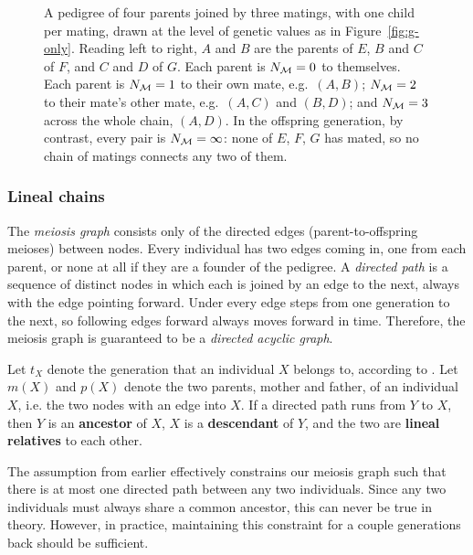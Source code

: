\documentclass[12pt]{article}
\begin{document}
\begin{figure}[H]
    \begin{floatcard}
        
        \caption{%
            A pedigree of four parents joined by three matings, with one child per mating, drawn at the level of genetic values as in Figure~\ref{fig:g-only}.
            Reading left to right, $A$ and $B$ are the parents of $E$, $B$ and $C$ of $F$, and $C$ and $D$ of $G$.
            Each parent is $N_{\mathcal{M}} = 0$ to themselves.
            Each parent is $N_{\mathcal{M}} = 1$ to their own mate, e.g.\ $(A,B)$; $N_{\mathcal{M}} = 2$ to their mate's other mate, e.g.\ $(A,C)$ and $(B,D)$; and $N_{\mathcal{M}} = 3$ across the whole chain, $(A,D)$.
            In the offspring generation, by contrast, every pair is $N_{\mathcal{M}} = \infty$: none of $E$, $F$, $G$ has mated, so no chain of matings connects any two of them.%
        }
        \label{fig:step-sib}
    \end{floatcard}
\end{figure}

\subsubsection{Lineal chains}
The \emph{meiosis graph} consists only of the directed edges (parent-to-offspring meioses) between nodes.
Every individual has two edges coming in, one from each parent, or none at all if they are a founder of the pedigree.
A \emph{directed path} is a sequence of distinct nodes in which each is joined by an edge to the next, always with the edge pointing forward.
Under  every edge steps from one generation to the next, so following edges forward always moves forward in time.
Therefore, the meiosis graph is guaranteed to be a \emph{directed acyclic graph}.

Let $t_X$ denote the generation that an individual $X$ belongs to, according to .
Let $m(X)$ and $p(X)$ denote the two parents, mother and father, of an individual $X$, i.e. the two nodes with an edge into $X$.
If a directed path runs from $Y$ to $X$, then $Y$ is an \textbf{ancestor} of $X$, $X$ is a \textbf{descendant} of $Y$, and the two are \textbf{lineal relatives} to each other.

The  assumption from earlier effectively constrains our meiosis graph such that there is at most one directed path between any two individuals.
Since any two individuals must always share a common ancestor, this can never be true in theory.
However, in practice, maintaining this constraint for a couple generations back should be sufficient.
\end{document}
